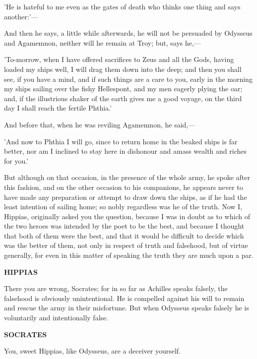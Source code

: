 \documentclass[11pt,letter]{article}
\begin{document}
\par  'He is hateful to me even as the gates of death who thinks one thing and says another:'—

\par  And then he says, a little while afterwards, he will not be persuaded by Odysseus and Agamemnon, neither will he remain at Troy; but, says he,—

\par  'To-morrow, when I have offered sacrifices to Zeus and all the Gods, having loaded my ships well, I will drag them down into the deep; and then you shall see, if you have a mind, and if such things are a care to you, early in the morning my ships sailing over the fishy Hellespont, and my men eagerly plying the oar; and, if the illustrious shaker of the earth gives me a good voyage, on the third day I shall reach the fertile Phthia.'

\par  And before that, when he was reviling Agamemnon, he said,—

\par  'And now to Phthia I will go, since to return home in the beaked ships is far better, nor am I inclined to stay here in dishonour and amass wealth and riches for you.'

\par  But although on that occasion, in the presence of the whole army, he spoke after this fashion, and on the other occasion to his companions, he appears never to have made any preparation or attempt to draw down the ships, as if he had the least intention of sailing home; so nobly regardless was he of the truth. Now I, Hippias, originally asked you the question, because I was in doubt as to which of the two heroes was intended by the poet to be the best, and because I thought that both of them were the best, and that it would be difficult to decide which was the better of them, not only in respect of truth and falsehood, but of virtue generally, for even in this matter of speaking the truth they are much upon a par.

\par \textbf{HIPPIAS}
\par   There you are wrong, Socrates; for in so far as Achilles speaks falsely, the falsehood is obviously unintentional. He is compelled against his will to remain and rescue the army in their misfortune. But when Odysseus speaks falsely he is voluntarily and intentionally false.

\par \textbf{SOCRATES}
\par   You, sweet Hippias, like Odysseus, are a deceiver yourself.
\end{document}
